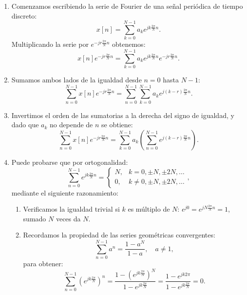 \documentclass[11pt,a4paper,openany]{book}
\begin{document}
\begin{enumerate}
	\item Comenzamos escribiendo la serie de Fourier de una señal periódica de tiempo discreto:
	\begin{equation}
		x[n] = \sum_{k=0}^{N-1} a_{k} e^{jk\frac{2\pi}{N}n}.
	\end{equation}
	Multiplicando la serie por $e^{-jr\frac{2\pi}{N}n}$ obtenemos:
	\begin{equation}
		x[n] e^{-jr\frac{2\pi}{N}n} = \sum_{k=0}^{N-1} a_{k} e^{jk\frac{2\pi}{N}n} e^{-jr\frac{2\pi}{N}n}.
	\end{equation}
	
	\item Sumamos ambos lados de la igualdad desde $n=0$ hasta $N-1$:
	\begin{equation}
		\sum_{n=0}^{N-1} x[n] e^{-jr\frac{2\pi}{N}n} = \sum_{n=0}^{N-1} \sum_{k=0}^{N-1} a_{k} e^{j(k-r)\frac{2\pi}{N}n}.
	\end{equation}
	
	\item Invertimos el orden de las sumatorias a la derecha del signo de igualdad, y dado que $a_{k}$ no depende de $n$ se obtiene:
	\begin{equation}
		\sum_{n=0}^{N-1} x[n] e^{-jr\frac{2\pi}{N}n} = \sum_{k=0}^{N-1} a_{k} \left( \sum_{n=0}^{N-1} e^{j(k-r)\frac{2\pi}{N}n} \right).
	\end{equation}
	
	\item Puede probarse que por ortogonalidad:
	\begin{equation}
		\sum_{n=0}^{N-1} e^{jk\frac{2\pi}{N}n} =
		\begin{cases} 
			N, & k=0, \pm N, \pm 2N, \dots \\ 
			0, & k \neq 0, \pm N, \pm 2N, \dots
		\end{cases},
	\end{equation}
	mediante el siguiente razonamiento:
	\begin{enumerate}
		\item Verificamos la igualdad trivial si $k$ es múltiplo de $N$: $e^{j0} = e^{jN\frac{2\pi}{N}n} = 1$, sumado $N$ veces da $N$.
		\item Recordamos la propiedad de las series geométricas convergentes:
		\begin{equation}
			\sum_{n=0}^{N-1} a^n = \frac{1-a^{N}}{1-a}, \quad a \neq 1,
		\end{equation}
		para obtener:
		\begin{equation}
			\sum_{n=0}^{N-1} \left( e^{jk\frac{2\pi}{N}} \right)^n = \frac{1-\left(e^{jk\frac{2\pi}{N}}\right)^N}{1-e^{jk\frac{2\pi}{N}}} = \frac{1-e^{jk2\pi}}{1-e^{jk\frac{2\pi}{N}}} = 0.
		\end{equation}
	\end{enumerate}
	

\end{enumerate}
\end{document}
